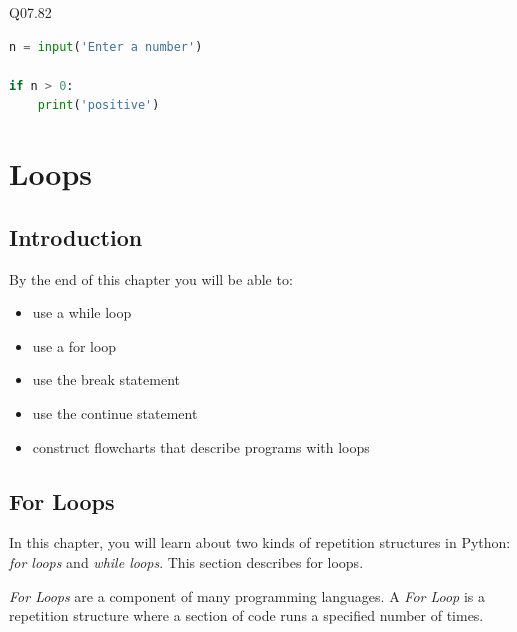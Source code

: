 \documentclass{book}
\begin{document}
    
        Q07.82

\begin{lstlisting}[language=Python]
n = input('Enter a number')

if n > 0:
    print('positive')
\end{lstlisting}
    




    
        \chapter{Loops}\label{loops}
    




    
        \section{Introduction}\label{introduction}
    




    
        By the end of this chapter you will be able to:

\begin{itemize}
\item
  use a while loop
\item
  use a for loop
\item
  use the break statement
\item
  use the continue statement
\item
  construct flowcharts that describe programs with loops
\end{itemize}
        \newpage



    




    
        \section{For Loops}\label{for-loops}
    




    
        In this chapter, you will learn about two kinds of repetition structures
in Python: \emph{for loops} and \emph{while loops}. This section
describes for loops.

\emph{For Loops} are a component of many programming languages. A
\emph{For Loop} is a repetition structure where a section of code runs a
specified number of times.
\end{document}
